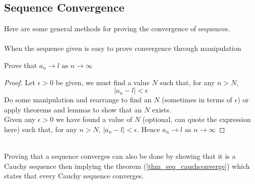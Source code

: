 \documentclass[10pt, a4paper]{article}
\newcommand{\limas}[3][n]{#2 \rightarrow #3 \text{ as } #1 \rightarrow \infty}
\begin{document}
\subsection{Sequence Convergence}
Here are some general methods for proving the convergence of sequences. \\
\\
When the sequence given is easy to prove convergence through manipulation
\begin{theorem}
    Prove that $\limas{a_n}{l}$
    \begin{proof}
    Let $\epsilon > 0$ be given, we must find a value $N$ such that, for any $n > N$,
    \[|a_n - l| < \epsilon\]
    Do some manipulation and rearrange to find an $N$ (sometimes in terms of $\epsilon$) or apply theorems and lemmas to show that an $N$ exists. \\
    Given any $\epsilon > 0$ we have found a value of $N$ (optional, can quote the expression here) such that, for any $n > N$, $|a_n - l| < \epsilon$. Hence $\limas{a_n}{l}$
    \end{proof}
\end{theorem}
\phantom{}
\\
Proving that a sequence converges can also be done by showing that it is a Cauchy sequence then implying the theorem (\autoref{thm_seq_cauchconverge}) which states that every Cauchy sequence converges. \\
\end{document}
